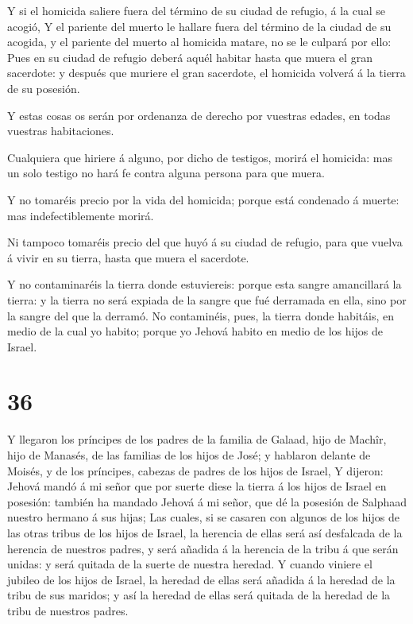  Y si el homicida saliere fuera del término de su ciudad de
refugio, á la cual se acogió,  Y el pariente del muerto le
hallare fuera del término de la ciudad de su acogida, y el pariente del
muerto al homicida matare, no se le culpará por ello:  Pues
en su ciudad de refugio deberá aquél habitar hasta que muera el gran
sacerdote: y después que muriere el gran sacerdote, el homicida volverá
á la tierra de su posesión.

 Y estas cosas os serán por ordenanza de derecho por
vuestras edades, en todas vuestras habitaciones.

 Cualquiera que hiriere á alguno, por dicho de testigos,
morirá el homicida: mas un solo testigo no hará fe contra alguna persona
para que muera.

 Y no tomaréis precio por la vida del homicida; porque está
condenado á muerte: mas indefectiblemente morirá.

 Ni tampoco tomaréis precio del que huyó á su ciudad de
refugio, para que vuelva á vivir en su tierra, hasta que muera el
sacerdote.

 Y no contaminaréis la tierra donde estuviereis: porque
esta sangre amancillará la tierra: y la tierra no será expiada de la
sangre que fué derramada en ella, sino por la sangre del que la derramó.
 No contaminéis, pues, la tierra donde habitáis, en medio
de la cual yo habito; porque yo Jehová habito en medio de los hijos de
Israel.

\hypertarget{section-35}{%
\section{36}\label{section-35}}

 Y llegaron los príncipes de los padres de la familia de
Galaad, hijo de Machîr, hijo de Manasés, de las familias de los hijos de
José; y hablaron delante de Moisés, y de los príncipes, cabezas de
padres de los hijos de Israel,  Y dijeron: Jehová mandó á mi
señor que por suerte diese la tierra á los hijos de Israel en posesión:
también ha mandado Jehová á mi señor, que dé la posesión de Salphaad
nuestro hermano á sus hijas;  Las cuales, si se casaren con
algunos de los hijos de las otras tribus de los hijos de Israel, la
herencia de ellas será así desfalcada de la herencia de nuestros padres,
y será añadida á la herencia de la tribu á que serán unidas: y será
quitada de la suerte de nuestra heredad.  Y cuando viniere
el jubileo de los hijos de Israel, la heredad de ellas será añadida á la
heredad de la tribu de sus maridos; y así la heredad de ellas será
quitada de la heredad de la tribu de nuestros padres.

